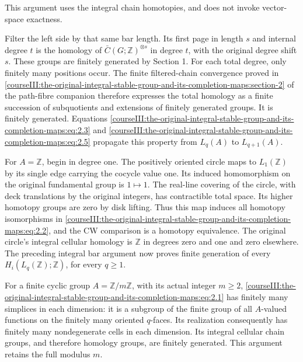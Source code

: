 This argument uses the integral chain homotopies, and does not invoke vector-space exactness.

Filter the left side by that same bar length. Its first page in length \(s\) and internal degree \(t\) is the homology of \(\bar C(G;\mathbb Z)^{\otimes s}\) in degree \(t\), with the original degree shift \(s\). These groups are finitely generated by Section 1. For each total degree, only finitely many positions occur. The finite filtered-chain convergence proved in \cref{courseIII:the-original-integral-stable-group-and-its-completion-maps:section-2} of the path-fibre companion therefore expresses the total homology as a finite succession of subquotients and extensions of finitely generated groups. It is finitely generated. Equations \eqref{courseIII:the-original-integral-stable-group-and-its-completion-maps:eq:2.3} and \eqref{courseIII:the-original-integral-stable-group-and-its-completion-maps:eq:2.5} propagate this property from \(L_q(A)\) to \(L_{q+1}(A)\).

For \(A=\mathbb Z\), begin in degree one. The positively oriented circle maps to \(L_1(\mathbb Z)\) by its single edge carrying the cocycle value one. Its induced homomorphism on the original fundamental group is \(1\mapsto1\). The real-line covering of the circle, with deck translations by the original integers, has contractible total space. Its higher homotopy groups are zero by disk lifting. Thus this map induces all homotopy isomorphisms in \eqref{courseIII:the-original-integral-stable-group-and-its-completion-maps:eq:2.2}, and the CW comparison is a homotopy equivalence. The original circle's integral cellular homology is \(\mathbb Z\) in degrees zero and one and zero elsewhere. The preceding integral bar argument now proves finite generation of every \(H_i(L_q(\mathbb Z);\mathbb Z)\), for every \(q\geq1\).

For a finite cyclic group \(A=\mathbb Z/m\mathbb Z\), with its actual integer \(m\geq2\), \eqref{courseIII:the-original-integral-stable-group-and-its-completion-maps:eq:2.1} has finitely many simplices in each dimension: it is a subgroup of the finite group of all \(A\)-valued functions on the finitely many oriented \(q\)-faces. Its realization consequently has finitely many nondegenerate cells in each dimension. Its integral cellular chain groups, and therefore homology groups, are finitely generated. This argument retains the full modulus \(m\).

